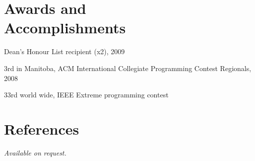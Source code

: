 \documentclass[margin,line,letterpaper]{resume}
\begin{document}
\begin{resume}
  \section{\mysidestyle Awards and\\Accomplishments}

  \begin{list2}
    \item Dean's Honour List recipient (x2), 2009
    \item 3rd in Manitoba, ACM International Collegiate Programming Contest Regionals, 2008
    \item 33rd world wide, IEEE Extreme programming contest
  \end{list2}

  \section{\mysidestyle References}

  {\sl Available on request.}

\end{resume}
\end{document}

